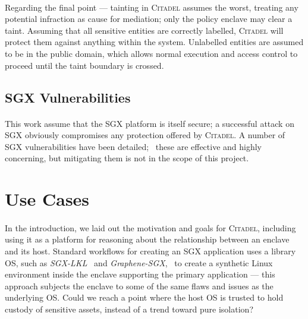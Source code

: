 \paragraph{} Regarding the final point --- tainting in \textsc{Citadel} assumes the worst, treating any potential infraction as cause for mediation; only the policy enclave may clear a taint. Assuming that all sensitive entities are correctly labelled, \textsc{Citadel} will protect them against anything within the system. Unlabelled entities are assumed to be in the public domain, which allows normal execution and access control to proceed until the taint boundary is crossed.

\subsection{SGX Vulnerabilities}
\label{sec:sgx-vulnerabilities}
\paragraph{} This work assume that the SGX platform is itself secure; a successful attack on SGX obviously compromises any protection offered by \textsc{Citadel}. A number of SGX vulnerabilities have been detailed;~\cite{lipp2018meltdown, vanbulck2018foreshadow, Schwarz2019ZombieLoad, ridl, vanbulck2020lvi} these are effective and highly concerning, but mitigating them is not in the scope of this project.

\section{Use Cases}

\paragraph{} In the introduction, we laid out the motivation and goals for \textsc{Citadel}, including using it as a platform for reasoning about the relationship between an enclave and its host. Standard workflows for creating an SGX application uses a library OS, such as \textit{SGX-LKL}~\cite{priebe2019sgxlkl} and \textit{Graphene-SGX},~\cite{203255} to create a synthetic Linux environment inside the enclave supporting the primary application --- this approach subjects the enclave to some of the same flaws and issues as the underlying OS. Could we reach a point where the host OS is trusted to hold custody of sensitive assets, instead of a trend toward pure isolation?

